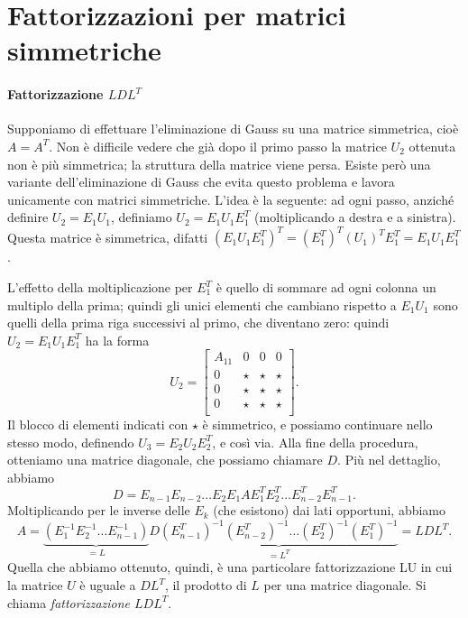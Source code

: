 \documentclass[a4paper]{report}
\theoremstyle{definiton}
\theoremstyle{remark}
\begin{document}
\section{Fattorizzazioni per matrici simmetriche}

\paragraph{Fattorizzazione $LDL^T$}

Supponiamo di effettuare l'eliminazione di Gauss su una matrice simmetrica, cioè $A = A^T$. Non è difficile vedere che già dopo il primo passo la matrice $U_2$ ottenuta non è più simmetrica; la struttura della matrice viene persa. Esiste però una variante dell'eliminazione di Gauss che evita questo problema e lavora unicamente con matrici simmetriche. L'idea è la seguente: ad ogni passo, anziché definire $U_{2} = E_1 U_1$, definiamo $U_{2} = E_1 U_1 E_1^T$ (moltiplicando a destra e a sinistra). Questa matrice è simmetrica, difatti $(E_1 U_1 E_1^T)^T = (E_1^T)^T (U_1)^T E_1^T = E_1 U_1 E_1^T$.

L'effetto della moltiplicazione per $E_1^T$ è quello di sommare ad ogni colonna un multiplo della prima; quindi gli unici elementi che cambiano rispetto a $E_1 U_1$ sono quelli della prima riga successivi al primo, che diventano zero: quindi $U_2 = E_1 U_1 E_1^T$ ha la forma
\[
U_2 = \begin{bmatrix}
    A_{11} & 0 & 0 & 0\\
    0 & \star & \star & \star\\
    0 & \star & \star & \star\\
    0 & \star & \star & \star\\
\end{bmatrix}.  
\]
Il blocco di elementi indicati con $\star$ è simmetrico, e possiamo continuare nello stesso modo, definendo $U_3 = E_2 U_2 E_2^T$, e così via. Alla fine della procedura, otteniamo una matrice diagonale, che possiamo chiamare $D$. Più nel dettaglio, abbiamo
\[
D = E_{n-1}E_{n-2}\dots E_2 E_1 A E_1^T E_2^T\dots E_{n-2}^T E_{n-1}^T.
\]
Moltiplicando per le inverse delle $E_k$ (che esistono) dai lati opportuni, abbiamo
\[
A = \underbrace{(E_1^{-1}E_2^{-1}\dots E_{n-1}^{-1}) }_{=L}D \underbrace{(E_{n-1}^T)^{-1}  (E_{n-2}^T)^{-1} \dots (E_{2}^T)^{-1} (E_{1}^T)^{-1}}_{=L^T} = LDL^T.
\]
Quella che abbiamo ottenuto, quindi, è una particolare fattorizzazione LU in cui la matrice $U$ è uguale a $DL^T$, il prodotto di $L$ per una matrice diagonale. Si chiama \emph{fattorizzazione $LDL^T$}.
\end{document}
